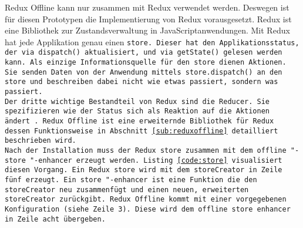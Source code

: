 %
%
Redux Offline kann nur zusammen mit Redux verwendet werden. Deswegen ist für diesen Prototypen die Implementierung von Redux vorausgesetzt.
Redux ist eine Bibliothek zur Zustandsverwaltung in JavaScriptanwendungen.
Mit Redux hat jede Applikation genau einen \tt{store}. Dieser hat den Applikationsstatus, der via \tt{dispatch()} aktualisiert, und via \tt{getState()} gelesen werden kann.
Als einzige Informationsquelle für den \tt{store} dienen Aktionen. Sie senden Daten von der Anwendung mittels \tt{store.dispatch()} an den \tt{store} und beschreiben dabei nicht wie etwas passiert, sondern was passiert.\\
Der dritte wichtige Bestandteil von Redux sind die \tt{Reducer}. Sie spezifizieren wie der Status sich als Reaktion auf die Aktionen ändert~\cite{redux}.
% 
Redux Offline ist eine erweiternde Bibliothek für Redux dessen Funktionsweise in Abschnitt \ref{sub:reduxoffline} detailliert beschrieben wird.\\
Nach der Installation muss der Redux \tt{store} zusammen mit dem \tt{offline "-store "-enhancer} erzeugt werden. Listing \ref{code:store} visualisiert diesen Vorgang. Ein Redux \tt{store} wird mit dem \tt{storeCreator} in Zeile fünf erzeugt. Ein \tt{store "-enhancer} ist eine Funktion die den \tt{storeCreator} neu zusammenfügt und einen neuen, erweiterten \tt{storeCreator} zurückgibt.
Redux Offline kommt mit einer vorgegebenen Konfiguration (siehe Zeile 3). Diese wird dem \tt{offline store enhancer} in Zeile acht übergeben.
\begin{center}
  
\end{center}
